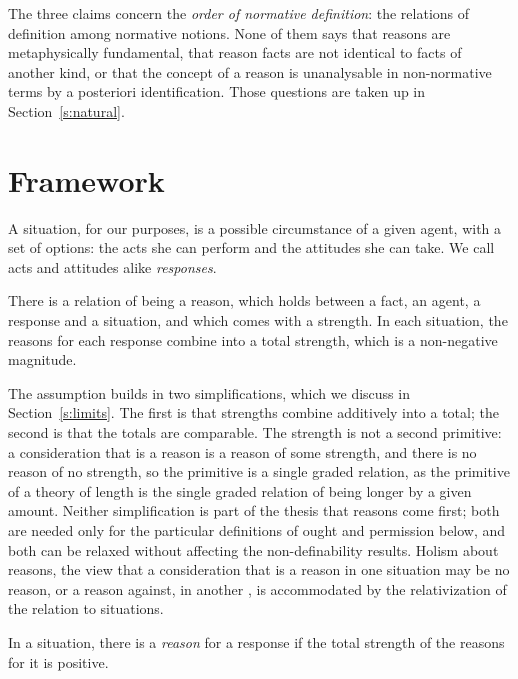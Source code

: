 \documentclass{situationist-preprint}
\begin{document}
The three claims concern the \emph{order of normative definition}: the relations of definition among normative notions. None of them says that reasons are metaphysically fundamental, that reason facts are not identical to facts of another kind, or that the concept of a reason is unanalysable in non-normative terms by a posteriori identification. Those questions are taken up in Section~\ref{s:natural}.

\section{Framework}

A situation, for our purposes, is a possible circumstance of a given agent, with a set of options: the acts she can perform and the attitudes she can take. We call acts and attitudes alike \emph{responses}.

\begin{assumption}\label{a:prim}
There is a relation of being a reason, which holds between a fact, an agent, a response and a situation, and which comes with a strength. In each situation, the reasons for each response combine into a total strength, which is a non-negative magnitude.
\end{assumption}

The assumption builds in two simplifications, which we discuss in Section~\ref{s:limits}. The first is that strengths combine additively into a total; the second is that the totals are comparable. The strength is not a second primitive: a consideration that is a reason is a reason of some strength, and there is no reason of no strength, so the primitive is a single graded relation, as the primitive of a theory of length is the single graded relation of being longer by a given amount. Neither simplification is part of the thesis that reasons come first; both are needed only for the particular definitions of ought and permission below, and both can be relaxed without affecting the non-definability results. Holism about reasons, the view that a consideration that is a reason in one situation may be no reason, or a reason against, in another \citep{Dancy2004}, is accommodated by the relativization of the relation to situations.

\begin{definition}\label{d:reason}
In a situation, there is a \emph{reason} for a response if the total strength of the reasons for it is positive.
\end{definition}
\end{document}

